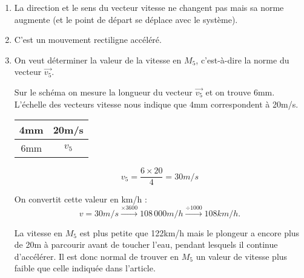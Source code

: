 \documentclass[12pt,a4paper,fleqn]{article}
\begin{document}
\begin{enumerate}
\item La direction et le sens du vecteur vitesse ne changent pas mais sa norme augmente (et le point de départ se déplace avec le système).

\item C'est un mouvement rectiligne accéléré.

\item On veut déterminer la valeur de la vitesse en $M_5$, c'est-à-dire la norme du vecteur $\vec{v_5}$.

Sur le schéma on mesure la longueur du vecteur $\vec{v_5}$ et on trouve \unit{6}{mm}.
L'échelle des vecteurs vitesse nous indique que \unit{4}{mm} correspondent à \unit{20}{m/s}.
\begin{multicols}{2}
\begin{center}
\begin{tabular}{c|c}
\unit{4}{mm} & \unit{20}{m/s} \\
\hline
\unit{6}{mm} & $v_5$
\end{tabular}
\end{center}
\[
v_5 = \frac{6 \times 20}{4} = \unit{30}{m/s}
\]
\end{multicols}
On convertit cette valeur en km/h :
\[
v = \unit{30}{m/s} \xrightarrow{\times 3600} \unit{108\,000}{m/h} \xrightarrow{\div 1000} \unit{108}{km/h}.
\]

La vitesse en $M_5$ est plus petite que \unit{122}{km/h} mais le plongeur a encore plus de \unit{20}{m} à parcourir avant de toucher l'eau, pendant lesquels il continue d'accélérer.
Il est donc normal de trouver en $M_5$ un valeur de vitesse plus faible que celle indiquée dans l'article.
\end{enumerate}
\end{document}
